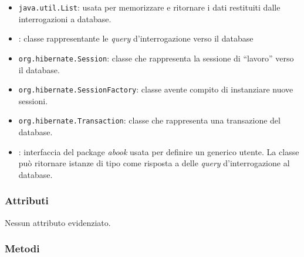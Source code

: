 \begin{itemize}
	\item \texttt{java.util.List}: usata per memorizzare e ritornare i dati restituiti dalle interrogazioni a database.
	\item {}: classe rappresentante le \textit{query} d'interrogazione verso il database
	\item \texttt{org.hibernate.Session}: classe che rappresenta la sessione di ``lavoro'' verso il database.
	\item \texttt{org.hibernate.SessionFactory}: classe avente compito di instanziare nuove sessioni.
	\item \texttt{org.hibernate.Transaction}: classe che rappresenta una transazione del database.
	\item {}: interfaccia del package \textit{abook} usata per definire un generico utente. La classe può ritornare istanze di tipo  come risposta a delle \textit{query} d'interrogazione al database.
	
\end{itemize}

\subsubsection*{Attributi}

Nessun attributo evidenziato.

\subsubsection*{Metodi}

